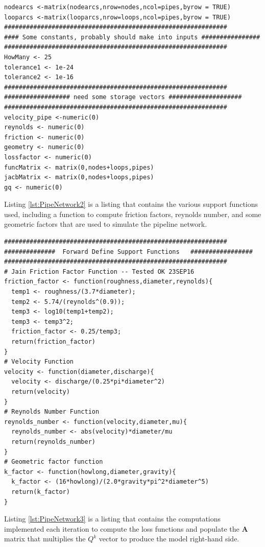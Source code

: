 \begin{lstlisting}
nodearcs <-matrix(nodearcs,nrow=nodes,ncol=pipes,byrow = TRUE)
looparcs <-matrix(looparcs,nrow=loops,ncol=pipes,byrow = TRUE)
#############################################################
#### Some constants, probably should make into inputs ################
#############################################################
HowMany <- 25
tolerance1 <- 1e-24
tolerance2 <- 1e-16
#############################################################
################## need some storage vectors ####################
#############################################################
velocity_pipe <-numeric(0)
reynolds <- numeric(0)
friction <- numeric(0)
geometry <- numeric(0)
lossfactor <- numeric(0)
funcMatrix <- matrix(0,nodes+loops,pipes)
jacbMatrix <- matrix(0,nodes+loops,pipes)
gq <- numeric(0)
\end{lstlisting}   

Listing \ref{lst:PipeNetwork2} is a listing that contains the various support functions used, including a function to compute friction factors, reynolds number, and some geometric factors that are used to simulate the pipeline network.
\clearpage

\begin{lstlisting}[caption=R code demonstrating a Pipeline Network Simulator \\ This fragment of code contains the functions for computing head losses, label=lst:PipeNetwork2]
#############################################################
##############  Forward Define Support Functions   #################
#############################################################
# Jain Friction Factor Function -- Tested OK 23SEP16
friction_factor <- function(roughness,diameter,reynolds){
  temp1 <- roughness/(3.7*diameter);
  temp2 <- 5.74/(reynolds^(0.9));
  temp3 <- log10(temp1+temp2);
  temp3 <- temp3^2;
  friction_factor <- 0.25/temp3;
  return(friction_factor)
}
# Velocity Function
velocity <- function(diameter,discharge){
  velocity <- discharge/(0.25*pi*diameter^2)
  return(velocity)
}
# Reynolds Number Function
reynolds_number <- function(velocity,diameter,mu){
  reynolds_number <- abs(velocity)*diameter/mu
  return(reynolds_number)
}
# Geometric factor function
k_factor <- function(howlong,diameter,gravity){
  k_factor <- (16*howlong)/(2.0*gravity*pi^2*diameter^5)
  return(k_factor)
}
\end{lstlisting}   

Listing \ref{lst:PipeNetwork3} is a listing that contains the computations implemented each iteration to compute the loss functions and populate the \textbf{A} matrix that multiplies the $Q^{k}$ vector to produce the model right-hand side.

